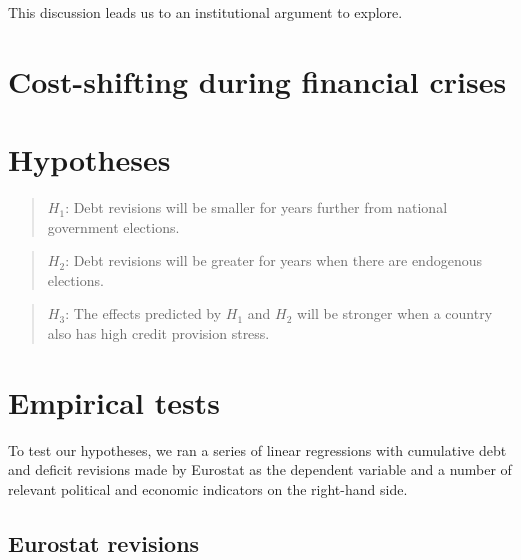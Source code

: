 \documentclass[]{article}
\begin{document}
This discussion leads us to an institutional argument to explore. 

\cite{DeCastro2013} \cite{Alt2014}

\section{Cost-shifting during financial crises}

\cite{GandrudHallerberg2016}

\section{Hypotheses}

\begin{quote}
    $H_{1}$: Debt revisions will be smaller for years further from national government elections.
\end{quote}

\begin{quote}
    $H_{2}$: Debt revisions will be greater for years when there are endogenous elections.
\end{quote}

\begin{quote}
    $H_{3}$: The effects predicted by $H_{1}$ and $H_{2}$ will be stronger when a country also has high credit provision stress.
\end{quote}

\section{Empirical tests}

To test our hypotheses, we ran a series of linear regressions with cumulative debt and deficit revisions made by Eurostat as the dependent variable and a number of relevant political and economic indicators on the right-hand side.

\subsection{Eurostat revisions}
\end{document}

